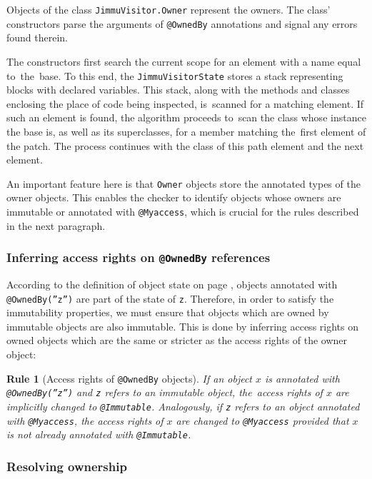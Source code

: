 \documentclass{pracamgr}
\theoremstyle{break}
\theoremstyle{break}
\theoremstyle{break}
\newtheorem{verrule}{Rule}
\begin{document}
Objects of the class \texttt{JimmuVisitor.Owner} represent the
owners. The class' constructors parse the arguments of
\texttt{@OwnedBy} annotations and signal any errors found therein.

The constructors first search the current scope for an element with a
name equal to~the~base. To this end, the \texttt{JimmuVisitorState}
stores a stack representing blocks with declared variables. This
stack, along with the methods and classes enclosing the place of code
being inspected, is~scanned for a matching element. If such an element
is found, the algorithm proceeds to~scan the class whose instance the
base is, as well as its superclasses, for a member matching the~first
element of the patch. The process continues with the class of this
path element and the next element.

An important feature here is that \texttt{Owner} objects store the
annotated types of the owner objects. This enables the checker to
identify objects whose owners are immutable or annotated with
\texttt{@Myaccess}, which is crucial for the rules described in the
next paragraph.

\subsubsection{Inferring access rights on \texttt{@OwnedBy} references} 

According to the definition of object state on page
\pageref{def:state}, objects annotated with \texttt{@OwnedBy(''z'')}
are part of the state of \texttt{z}. Therefore, in order to satisfy
the immutability properties, we must ensure that objects which are
owned by immutable objects are also immutable. This is done by
inferring access rights on owned objects which are the same or
stricter as the access rights of the owner object:

\begin{verrule}[Access rights of \texttt{@OwnedBy} objects]
  If an object $x$ is annotated with \texttt{@OwnedBy(''z'')} and
  \texttt{z} refers to an immutable object, the~access rights of $x$
  are implicitly changed to \texttt{@Immutable}. Analogously, if
  \texttt{z} refers to an object annotated with \texttt{@Myaccess},
  the access rights of $x$ are changed to \texttt{@Myaccess} provided
  that $x$ is not already annotated with \texttt{@Immutable}.
\end{verrule}
\vspace{-0.7cm}

\subsubsection{Resolving ownership} 
\end{document}
